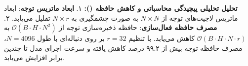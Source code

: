 \textbf{تحلیل تحلیلی پیچیدگی محاسباتی و کاهش حافظه ():}
۱. \textbf{ابعاد ماتریس توجه}: ابعاد ماتریس لاجیت‌های توجه از $N \times N$ به صورت چشمگیری به $N \times r$ تقلیل می‌یابد.
۲. \textbf{مصرف حافظه فعال‌سازی}: حافظه ذخیره‌سازی توجه از $\mathcal{O}(B \cdot H \cdot N^2)$ به $\mathcal{O}(B \cdot H \cdot N \cdot r)$ کاهش می‌یابد. با تنظیم $r = 32$ بر روی دنباله‌ای با طول $N = 4096$، مصرف حافظه توجه بیش از ۹۹.۲ درصد کاهش یافته و سرعت اجرای مدل تا چندین برابر افزایش می‌یابد.
